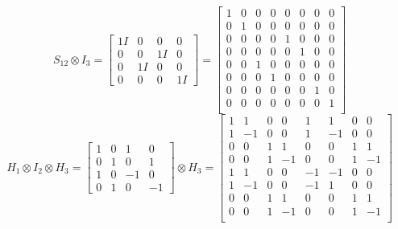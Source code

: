 \documentclass{../notatki}
\begin{document}
$$
S_{12} \otimes I_3 =
\begin{bmatrix}
  1 I & 0 & 0 & 0 \\
  0 & 0 & 1 I & 0 \\
  0 & 1 I & 0 & 0 \\
  0 & 0 & 0 & 1 I
\end{bmatrix} =
\begin{bmatrix}
  1 & 0 & 0 & 0 & 0 & 0 & 0 & 0 \\
  0 & 1 & 0 & 0 & 0 & 0 & 0 & 0 \\
  0 & 0 & 0 & 0 & 1 & 0 & 0 & 0 \\
  0 & 0 & 0 & 0 & 0 & 1 & 0 & 0 \\
  0 & 0 & 1 & 0 & 0 & 0 & 0 & 0 \\
  0 & 0 & 0 & 1 & 0 & 0 & 0 & 0 \\
  0 & 0 & 0 & 0 & 0 & 0 & 1 & 0 \\
  0 & 0 & 0 & 0 & 0 & 0 & 0 & 1 \\
\end{bmatrix}
$$
$$
H_1 \otimes I_2 \otimes H_3 =
\begin{bmatrix}
  1 & 0 & 1 & 0 \\
  0 & 1 & 0 & 1 \\
  1 & 0 & -1 & 0 \\
  0 & 1 & 0 & -1
\end{bmatrix} \otimes H_3 =
\begin{bmatrix}
  1 & 1 & 0 & 0 & 1 & 1 & 0 & 0 \\
  1 & -1 & 0 & 0 & 1 & -1 & 0 & 0 \\
  0 & 0 & 1 & 1 & 0 & 0 & 1 & 1 \\
  0 & 0 & 1 & -1 & 0 & 0 & 1 & -1 \\
  1 & 1 & 0 & 0 & -1 & -1 & 0 & 0 \\
  1 & -1 & 0 & 0 & -1 & 1 & 0 & 0 \\
  0 & 0 & 1 & 1 & 0 & 0 & 1 & 1 \\
  0 & 0 & 1 & -1 & 0 & 0 & 1 & -1 \\
\end{bmatrix}
$$
\end{document}
